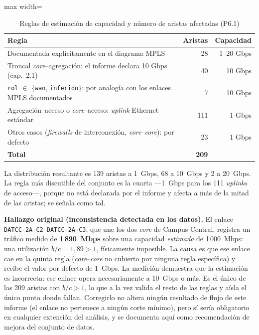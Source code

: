 \documentclass[10pt,a4paper]{extarticle}
\newcommand{\code}[1]{\texttt{\small #1}}
\begin{document}
\begin{table}[H]
\centering
\caption{Reglas de estimación de capacidad y número de aristas afectadas (P6.1)}
\label{tab:capacidad}
\small
\begin{adjustbox}{max width=\textwidth}
\begin{tabular}{p{9.5cm}rr}
\toprule
\textbf{Regla} & \textbf{Aristas} & \textbf{Capacidad} \\
\midrule
Documentada explícitamente en el diagrama MPLS & 28 & 1--20 Gbps \\
Troncal \textit{core}--agregación: el informe declara 10 Gbps (cap.~2.1) & 40 & 10 Gbps \\
\code{rol} $\in$ \{\code{wan}, \code{inferido}\}: por analogía con los enlaces MPLS documentados & 7 & 10 Gbps \\
Agregación--acceso o \textit{core}--acceso: \textit{uplink} Ethernet estándar & 111 & 1 Gbps \\
Otros casos (\textit{firewalls} de interconexión, \textit{core}--\textit{core}): por defecto & 23 & 1 Gbps \\
\midrule
\textbf{Total} & \textbf{209} & \\
\bottomrule
\end{tabular}
\end{adjustbox}
\end{table}

La distribución resultante es 139 aristas a 1~Gbps, 68 a 10~Gbps y 2 a 20~Gbps. La regla
más discutible del conjunto es la cuarta ---1~Gbps para los 111 \textit{uplinks} de
acceso---, porque no está declarada por el informe y afecta a más de la mitad de las
aristas; se señala como tal.

\begin{clave}
\textbf{Hallazgo original (inconsistencia detectada en los datos).} El enlace
\code{DATCC-2A-C2}--\code{DATCC-2A-C3}, que une los dos \textit{core} de Campus Central,
registra un tráfico medido de \textbf{1\,890~Mbps} sobre una capacidad \textit{estimada} de
1\,000~Mbps: una utilización $b/c = 1{,}89 > 1$, físicamente imposible. La causa es que ese
enlace cae en la quinta regla (\textit{core}--\textit{core} no cubierto por ninguna regla
específica) y recibe el valor por defecto de 1~Gbps. La medición demuestra que la
estimación es incorrecta: ese enlace opera necesariamente a 10~Gbps o más. Es el único de
las 209 aristas con $b/c > 1$, lo que a la vez valida el resto de las reglas y aísla el
único punto donde fallan. Corregirlo no altera ningún resultado de flujo de este informe
(el enlace no pertenece a ningún corte mínimo), pero sí sería obligatorio en cualquier
extensión del análisis, y se documenta aquí como recomendación de mejora del conjunto de
datos.
\end{clave}
\end{document}

